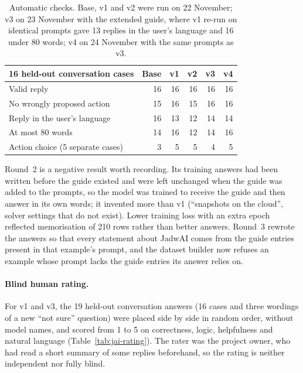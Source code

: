 \begin{table}[h]
\centering
\small
\begin{tabular}{@{}lrrrrr@{}}
\toprule
16 held-out conversation cases & Base & v1 & v2 & v3 & v4 \\
\midrule
Valid reply & 16 & 16 & 16 & 16 & 16 \\
No wrongly proposed action & 15 & 16 & 15 & 16 & 16 \\
Reply in the user's language & 16 & 13 & 12 & 14 & 14 \\
At most 80 words & 14 & 16 & 12 & 14 & 16 \\
\midrule
Action choice (5 separate cases) & 3 & 5 & 5 & 4 & 5 \\
\bottomrule
\end{tabular}
\caption{Automatic checks. Base, v1 and v2 were run on 22 November; v3 on 23 November with the extended guide, where v1 re-run on identical prompts gave 13 replies in the user's language and 16 under 80 words; v4 on 24 November with the same prompts as v3.}
\label{tab:jai-auto}
\end{table}

Round~2 is a negative result worth recording. Its training answers had been written before the guide existed and were left unchanged when the guide was added to the prompts, so the model was trained to receive the guide and then answer in its own words; it invented more than v1 (``snapshots on the cloud'', solver settings that do not exist). Lower training loss with an extra epoch reflected memorisation of 210 rows rather than better answers. Round~3 rewrote the answers so that every statement about JadwAI comes from the guide entries present in that example's prompt, and the dataset builder now refuses an example whose prompt lacks the guide entries its answer relies on.

\paragraph{Blind human rating.} For v1 and v3, the 19 held-out conversation answers (16 cases and three wordings of a new ``not sure'' question) were placed side by side in random order, without model names, and scored from 1 to 5 on correctness, logic, helpfulness and natural language (Table~\ref{tab:jai-rating}). The rater was the project owner, who had read a short summary of some replies beforehand, so the rating is neither independent nor fully blind.

